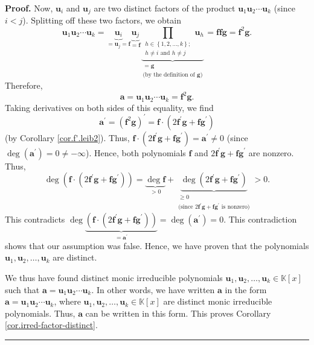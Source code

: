\documentclass[numbers=enddot,12pt,final,onecolumn,notitlepage]{scrartcl}%
\theoremstyle{definition}
\newenvironment{proof}[1][Proof]{\noindent\textbf{#1.} }{\ \rule{0.5em}{0.5em}}
\let\prodnonlimits\prod
\renewcommand{\prod}{\prodnonlimits\limits}
\begin{document}
\begin{proof}
Now, $\mathbf{u}_{i}$ and $\mathbf{u}_{j}$ are two distinct factors of the
product $\mathbf{u}_{1}\mathbf{u}_{2}\cdots\mathbf{u}_{k}$ (since $i<j$).
Splitting off these two factors, we obtain%
\[
\mathbf{u}_{1}\mathbf{u}_{2}\cdots\mathbf{u}_{k}=\underbrace{\mathbf{u}_{i}%
}_{=\mathbf{u}_{j}=\mathbf{f}}\underbrace{\mathbf{u}_{j}}_{=\mathbf{f}%
}\underbrace{\prod_{\substack{h\in\left\{  1,2,\ldots,k\right\}  ;\\h\neq
i\text{ and }h\neq j}}\mathbf{u}_{h}}_{\substack{=\mathbf{g}\\\text{(by the
definition of }\mathbf{g}\text{)}}}=\mathbf{ffg}=\mathbf{f}^{2}\mathbf{g}.
\]
Therefore,%
\[
\mathbf{a}=\mathbf{u}_{1}\mathbf{u}_{2}\cdots\mathbf{u}_{k}=\mathbf{f}%
^{2}\mathbf{g}.
\]
Taking derivatives on both sides of this equality, we find%
\[
\mathbf{a}^{\prime}=\left(  \mathbf{f}^{2}\mathbf{g}\right)  ^{\prime
}=\mathbf{f}\cdot\left(  2\mathbf{f}^{\prime}\mathbf{g}+\mathbf{fg}^{\prime
}\right)
\]
(by Corollary \ref{cor.f'.leib2}). Thus, $\mathbf{f}\cdot\left(
2\mathbf{f}^{\prime}\mathbf{g}+\mathbf{fg}^{\prime}\right)  =\mathbf{a}%
^{\prime}\neq0$ (since $\deg\left(  \mathbf{a}^{\prime}\right)  =0\neq-\infty
$). Hence, both polynomials $\mathbf{f}$ and $2\mathbf{f}^{\prime}%
\mathbf{g}+\mathbf{fg}^{\prime}$ are nonzero. Thus,%
\[
\deg\left(  \mathbf{f}\cdot\left(  2\mathbf{f}^{\prime}\mathbf{g}%
+\mathbf{fg}^{\prime}\right)  \right)  =\underbrace{\deg\mathbf{f}}%
_{>0}+\underbrace{\deg\left(  2\mathbf{f}^{\prime}\mathbf{g}+\mathbf{fg}%
^{\prime}\right)  }_{\substack{\geq0\\\text{(since }2\mathbf{f}^{\prime
}\mathbf{g}+\mathbf{fg}^{\prime}\text{ is nonzero)}}}>0.
\]
This contradicts $\deg\underbrace{\left(  \mathbf{f}\cdot\left(
2\mathbf{f}^{\prime}\mathbf{g}+\mathbf{fg}^{\prime}\right)  \right)
}_{=\mathbf{a}^{\prime}}=\deg\left(  \mathbf{a}^{\prime}\right)  =0$. This
contradiction shows that our assumption was false. Hence, we have proven that
the polynomials $\mathbf{u}_{1},\mathbf{u}_{2},\ldots,\mathbf{u}_{k}$ are distinct.

We thus have found distinct monic irreducible polynomials $\mathbf{u}%
_{1},\mathbf{u}_{2},\ldots,\mathbf{u}_{k}\in\mathbb{K}\left[  x\right]  $ such
that $\mathbf{a}=\mathbf{u}_{1}\mathbf{u}_{2}\cdots\mathbf{u}_{k}$. In other
words, we have written $\mathbf{a}$ in the form $\mathbf{a}=\mathbf{u}%
_{1}\mathbf{u}_{2}\cdots\mathbf{u}_{k}$, where $\mathbf{u}_{1},\mathbf{u}%
_{2},\ldots,\mathbf{u}_{k}\in\mathbb{K}\left[  x\right]  $ are distinct monic
irreducible polynomials. Thus, $\mathbf{a}$ can be written in this form. This
proves Corollary \ref{cor.irred-factor-distinct}.
\end{proof}
\end{document}
